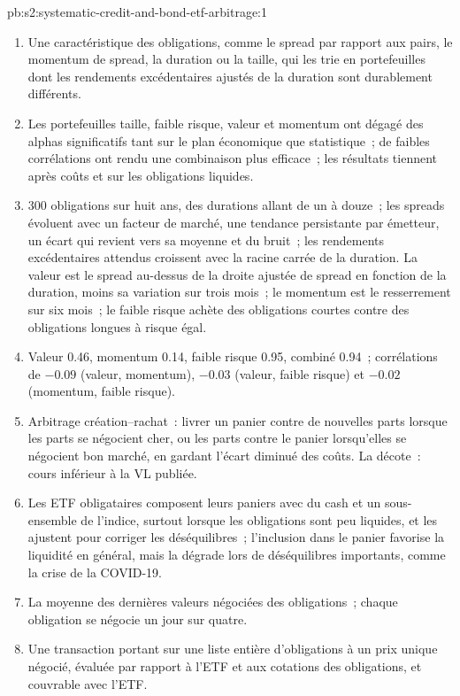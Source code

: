 \begin{solution}{pb:s2:systematic-credit-and-bond-etf-arbitrage:1}
\begin{enumerate}
\item Une caractéristique des obligations, comme le spread par rapport aux pairs, le momentum de spread, la duration ou la taille, qui les trie en portefeuilles dont les rendements excédentaires ajustés de la duration sont durablement
différents.
\item Les portefeuilles taille, faible risque, valeur et momentum ont dégagé des alphas significatifs tant sur le plan économique que statistique~; de faibles corrélations ont rendu une
combinaison plus efficace~; les résultats tiennent après coûts et sur les obligations liquides.
\item 300 obligations sur huit ans, des durations allant de un à douze~; les spreads évoluent avec un facteur de marché, une tendance persistante par émetteur, un écart qui revient vers sa moyenne et
du bruit~; les rendements excédentaires attendus croissent avec la racine carrée de la duration. La valeur est le spread au-dessus de la droite ajustée de spread en fonction de la duration, moins
sa variation sur trois mois~; le momentum est le resserrement sur six mois~; le faible risque achète des obligations courtes contre des obligations longues à risque égal.
\item Valeur 0.46, momentum 0.14, faible risque 0.95, combiné 0.94~; corrélations de $-0.09$ (valeur, momentum), $-0.03$ (valeur, faible risque) et $-0.02$
(momentum, faible risque).
\item Arbitrage création--rachat~: livrer un panier contre de nouvelles parts lorsque les parts se négocient cher, ou les parts contre le panier lorsqu'elles se négocient bon marché, en gardant l'écart
diminué des coûts. La décote~: cours inférieur à la VL publiée.
\item Les ETF obligataires composent leurs paniers avec du cash et un sous-ensemble de l'indice, surtout lorsque les obligations sont peu liquides, et les ajustent pour corriger les déséquilibres~; l'inclusion
dans le panier favorise la liquidité en général, mais la dégrade lors de déséquilibres importants, comme la crise de la COVID-19.
\item La moyenne des dernières valeurs négociées des obligations~; chaque obligation se négocie un jour sur quatre.
\item Une transaction portant sur une liste entière d'obligations à un prix unique négocié, évaluée par rapport à l'ETF et aux cotations des obligations, et couvrable avec l'ETF.

\end{enumerate}
\end{solution}
